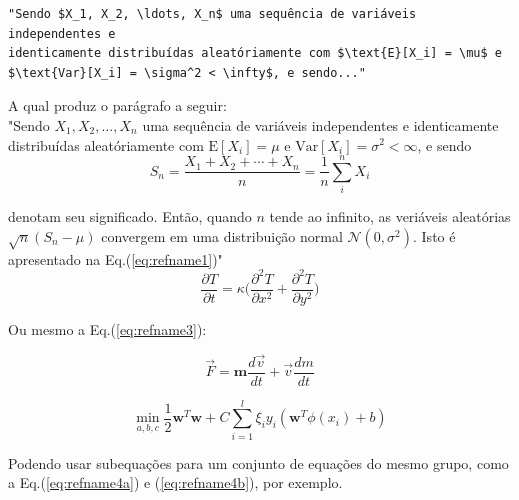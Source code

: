 \documentclass[12pt,A4,A4pt]{article}
\begin{document}
\begin{verbatim}
"Sendo $X_1, X_2, \ldots, X_n$ uma sequência de variáveis independentes e
identicamente distribuídas aleatóriamente com $\text{E}[X_i] = \mu$ e
$\text{Var}[X_i] = \sigma^2 < \infty$, e sendo..."
\end{verbatim}

A qual produz o parágrafo a seguir:\\


"Sendo $X_1, X_2, \ldots, X_n$ uma sequência de variáveis independentes e identicamente distribuídas aleatóriamente com $\text{E}[X_i] = \mu$ e $\text{Var}[X_i] = \sigma^2 < \infty$, e sendo
\begin{equation}
S_n = \frac{X_1 + X_2 + \cdots + X_n}{n}
      = \frac{1}{n}\sum_{i}^{n} X_i
\label{eq:refname1}
\end{equation}

denotam seu significado. Então, quando $n$ tende ao infinito, as veriáveis aleatórias $\sqrt{n}(S_n - \mu)$ convergem em uma distribuição normal $\mathcal{N}(0, \sigma^2)$. Isto é apresentado na Eq.(\ref{eq:refname1})"\\



\begin{equation}
 \frac{\partial T}{\partial t} =\kappa \big(\frac{\partial^2T}{\partial x^2}+\frac{\partial^2T}{\partial y^2} \big) 
 \label{eq:refname2}
\end{equation}

Ou mesmo a Eq.(\ref{eq:refname3}):

\begin{equation}
  \vec{F}=\mathbf{m} \frac{d \vec{v}}{dt} + \vec{v}\frac{dm}{dt} 
  \label{eq:refname3}
\end{equation}

\begin{subequations}
\begin{equation}
  \operatorname{min}_{a,b,c} 
  \frac{1}{2}\mathbf{w}^{T}\mathbf{w} + C \sum_{i=1}^{l}\xi_{i}
  \label{eq:refname4a}
\end{equation}    
\begin{equation}
  y_{i}\left(\mathbf{w}^{T}\phi(x_{i})+b\right)
  \label{eq:refname4b}
\end{equation}
\end{subequations}

Podendo usar subequações para um conjunto de equações do mesmo grupo, como a Eq.(\ref{eq:refname4a}) e (\ref{eq:refname4b}), por exemplo.
\end{document}
